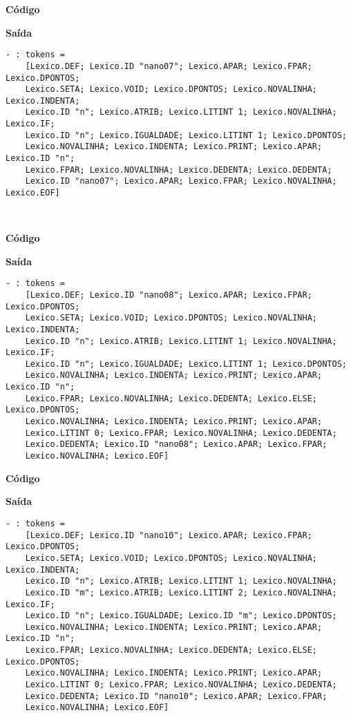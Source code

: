 \documentclass[hidelinks,12pt]{article}
\begin{document}
	{\large \textbf{Código} }
			
	
	{\large \textbf{Saída}}
	
	\begin{lstlisting}[caption=Analisador Léxico]
	- : tokens =
	[Lexico.DEF; Lexico.ID "nano07"; Lexico.APAR; Lexico.FPAR; Lexico.DPONTOS;
	Lexico.SETA; Lexico.VOID; Lexico.DPONTOS; Lexico.NOVALINHA; Lexico.INDENTA;
	Lexico.ID "n"; Lexico.ATRIB; Lexico.LITINT 1; Lexico.NOVALINHA; Lexico.IF;
	Lexico.ID "n"; Lexico.IGUALDADE; Lexico.LITINT 1; Lexico.DPONTOS;
	Lexico.NOVALINHA; Lexico.INDENTA; Lexico.PRINT; Lexico.APAR; Lexico.ID "n";
	Lexico.FPAR; Lexico.NOVALINHA; Lexico.DEDENTA; Lexico.DEDENTA;
	Lexico.ID "nano07"; Lexico.APAR; Lexico.FPAR; Lexico.NOVALINHA; Lexico.EOF]
	
	
	\end{lstlisting}
	
	{\large \textbf{Código} }
			
	
	{\large \textbf{Saída}}
	
	\begin{lstlisting}[caption=Analisador Léxico]
	- : tokens =
	[Lexico.DEF; Lexico.ID "nano08"; Lexico.APAR; Lexico.FPAR; Lexico.DPONTOS;
	Lexico.SETA; Lexico.VOID; Lexico.DPONTOS; Lexico.NOVALINHA; Lexico.INDENTA;
	Lexico.ID "n"; Lexico.ATRIB; Lexico.LITINT 1; Lexico.NOVALINHA; Lexico.IF;
	Lexico.ID "n"; Lexico.IGUALDADE; Lexico.LITINT 1; Lexico.DPONTOS;
	Lexico.NOVALINHA; Lexico.INDENTA; Lexico.PRINT; Lexico.APAR; Lexico.ID "n";
	Lexico.FPAR; Lexico.NOVALINHA; Lexico.DEDENTA; Lexico.ELSE; Lexico.DPONTOS;
	Lexico.NOVALINHA; Lexico.INDENTA; Lexico.PRINT; Lexico.APAR;
	Lexico.LITINT 0; Lexico.FPAR; Lexico.NOVALINHA; Lexico.DEDENTA;
	Lexico.DEDENTA; Lexico.ID "nano08"; Lexico.APAR; Lexico.FPAR;
	Lexico.NOVALINHA; Lexico.EOF]
	\end{lstlisting}
	
	{\large \textbf{Código} }
			
	
	{\large \textbf{Saída}}
	
	\begin{lstlisting}[caption=Analisador Léxico]
	- : tokens =
	[Lexico.DEF; Lexico.ID "nano10"; Lexico.APAR; Lexico.FPAR; Lexico.DPONTOS;
	Lexico.SETA; Lexico.VOID; Lexico.DPONTOS; Lexico.NOVALINHA; Lexico.INDENTA;
	Lexico.ID "n"; Lexico.ATRIB; Lexico.LITINT 1; Lexico.NOVALINHA;
	Lexico.ID "m"; Lexico.ATRIB; Lexico.LITINT 2; Lexico.NOVALINHA; Lexico.IF;
	Lexico.ID "n"; Lexico.IGUALDADE; Lexico.ID "m"; Lexico.DPONTOS;
	Lexico.NOVALINHA; Lexico.INDENTA; Lexico.PRINT; Lexico.APAR; Lexico.ID "n";
	Lexico.FPAR; Lexico.NOVALINHA; Lexico.DEDENTA; Lexico.ELSE; Lexico.DPONTOS;
	Lexico.NOVALINHA; Lexico.INDENTA; Lexico.PRINT; Lexico.APAR;
	Lexico.LITINT 0; Lexico.FPAR; Lexico.NOVALINHA; Lexico.DEDENTA;
	Lexico.DEDENTA; Lexico.ID "nano10"; Lexico.APAR; Lexico.FPAR;
	Lexico.NOVALINHA; Lexico.EOF]
	\end{lstlisting}
	
\end{document}
